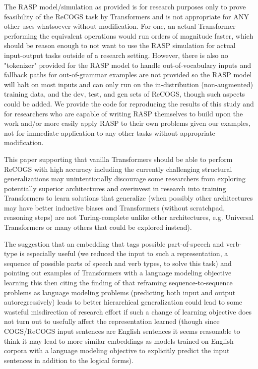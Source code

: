 \documentclass[11pt]{article}
\begin{document}
The RASP model/simulation as provided is for research purposes only to prove feasibility of the ReCOGS task by Transformers and is not appropriate for ANY other uses whatsoever without modification. For one, an actual Transformer performing the equivalent operations would run orders of magnitude faster, which should be reason enough to not want to use the RASP simulation for actual input-output tasks outside of a research setting. However, there is also no "tokenizer" provided for the RASP model to handle out-of-vocabulary inputs and fallback paths for out-of-grammar examples are not provided so the RASP model will halt on most inputs and can only run on the in-distribution (non-augmented) training data, and the dev, test, and gen sets of ReCOGS, though such aspects could be added. We provide the code for reproducing the results of this study and for researchers who are capable of writing RASP themselves to build upon the work and/or more easily apply RASP to their own problems given our examples, not for immediate application to any other tasks without appropriate modification.

This paper supporting that vanilla Transformers should be able to perform ReCOGS with high accuracy including the currently challenging structural generalizations may unintentionally discourage some researchers from exploring potentially superior architectures and overinvest in research into training Transformers to learn solutions that generalize (when possibly other architectures may have better inductive biases and Transformers (without scratchpad, reasoning steps) are not Turing-complete \citep{merrill2024expressivepowertransformerschain} \citep{delétang2023neuralnetworkschomskyhierarchy} \citep{Strobl2024} unlike other architectures, e.g. Universal Transformers \citep{Dehghani2019} or many others that could be explored instead).

The suggestion that an embedding that tags possible part-of-speech and verb-type is especially useful (we reduced the input to such a representation, a sequence of possible parts of speech and verb types, to solve this task) and pointing out examples of Transformers with a language modeling objective learning this \citep{tenney2019bertrediscoversclassicalnlp} then citing the finding of \citep{10.1162/tacl_a_00733} that reframing sequence-to-sequence problems as language modeling problems (predicting both input and output autoregressively) leads to better hierarchical generalization could lead to some wasteful misdirection of research effort if such a change of learning objective does not turn out to usefully affect the representation learned (though since COGS/ReCOGS input sentences are English sentences it seems reasonable to think it may lead to more similar embeddings as models trained on English corpora with a language modeling objective to explicitly predict the input sentences in addition to the logical forms).
\end{document}
